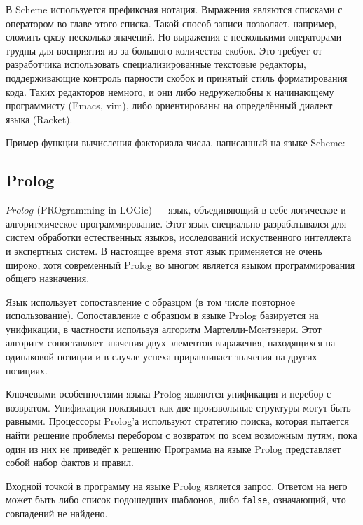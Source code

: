        В Scheme используется префиксная нотация.
        Выражения являются списками с оператором во главе этого списка.
        Такой способ записи позволяет, например, сложить сразу несколько значений.
        Но выражения с несколькими операторами трудны для восприятия из-за большого количества скобок.
        Это требует от разработчика использовать специализированные текстовые редакторы, поддерживающие контроль парности скобок и принятый стиль форматирования кода.
        Таких редакторов немного, и они либо недружелюбны к начинающему программисту (Emacs, vim), либо ориентированы на определённый диалект языка (Racket).

        Пример функции вычисления факториала числа, написанный на языке Scheme:

        

    \subsection{Prolog}
        $Prolog$ (PROgramming in LOGic) --- язык, объединяющий в себе логическое и алгоритмическое программирование.
        Этот язык специально разрабатывался для систем обработки естественных языков, исследований искуственного интеллекта и экспертных систем.
        В настоящее время этот язык применяется не очень широко\cite{TIOBE}, хотя современный Prolog во многом является языком программирования общего назначения.

        Язык использует сопоставление с образцом (в том числе повторное использование).
        Сопоставление с образцом в языке Prolog базируется на унификации, в частности используя алгоритм Мартелли-Монтэнери\cite{unify}.
        Этот алгоритм сопоставляет значения двух элементов выражения, находящихся на одинаковой позиции и в случае успеха приравнивает значения на других позициях.

        Ключевыми особенностями языка Prolog являются унификация и перебор с возвратом.
        Унификация показывает как две произвольные структуры могут быть равными.
        Процессоры Prolog'а используют стратегию поиска, которая пытается найти решение проблемы перебором с возвратом по всем возможным путям, пока один из них не приведёт к решению\cite{prolog}
        Программа на языке Prolog представляет собой набор фактов и правил.

        Входной точкой в программу на языке Prolog является запрос.
        Ответом на него может быть либо список подошедших шаблонов, либо \verb!false!, означающий, что совпадений не найдено.

